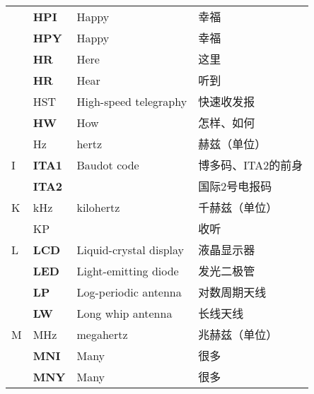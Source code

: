 \begin{longtable}[l]{llll}
    & \textbf{HPI}                      & Happy                                   & 幸福                  \\
    & \textbf{HPY}                      & Happy                                   & 幸福                  \\
    & \textbf{HR}                       & Here                                    & 这里                  \\
    & \textbf{HR}                       & Hear                                    & 听到                  \\
    & HST                               & High-speed telegraphy                   & 快速收发报               \\
    & \textbf{HW}                       & How                                     & 怎样、如何               \\
    & Hz                                & hertz                                   & 赫兹（单位）              \\
  I & \textbf{ITA1}                     & Baudot code                             & 博多码、ITA2的前身         \\
    & \textbf{ITA2}                     &                                         & 国际2号电报码             \\
  K & \unit{\kHz}                       & kilohertz                               & 千赫兹（单位）             \\
    & KP                                &                                         & 收听                  \\
  L & \textbf{LCD}                      & Liquid-crystal display                  & 液晶显示器               \\
    & \textbf{LED}                      & Light-emitting diode                    & 发光二极管               \\
    & \textbf{LP}                       & Log-periodic antenna                    & 对数周期天线              \\
    & \textbf{LW}                       & Long whip antenna                       & 长线天线                \\
  M & \unit{\MHz}                       & megahertz                               & 兆赫兹（单位）             \\
    & \textbf{MNI}                      & Many                                    & 很多                  \\
    & \textbf{MNY}                      & Many                                    & 很多                  \\

\end{longtable}
